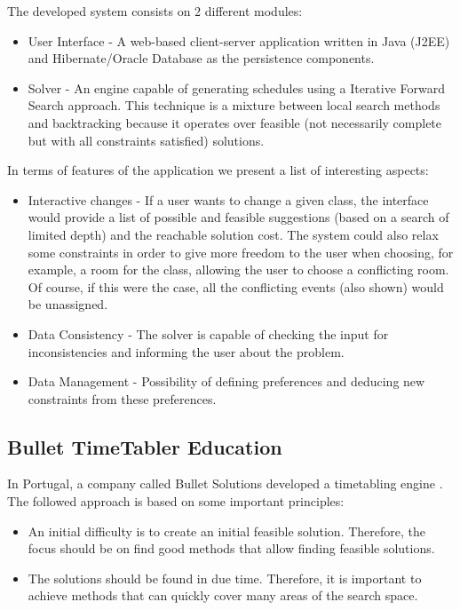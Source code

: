 The developed system consists on 2 different modules:
\begin{itemize}
	\item User Interface - A web-based client-server application written in Java (J2EE) and Hibernate/Oracle Database as the persistence components.
	\item Solver - An engine capable of generating schedules using a Iterative Forward Search approach. This technique is a mixture between local search methods and backtracking because it operates over feasible (not necessarily complete but with all constraints satisfied) solutions.
\end{itemize} 

In terms of features of the application we present a list of interesting aspects:
\begin{itemize}
	\item Interactive changes - If a user wants to change a given class, the interface would provide a list of possible and feasible suggestions (based on a search of limited depth) and the reachable solution cost. The system could also relax some constraints in order to give more freedom to the user when choosing, for example, a room for the class, allowing the user to choose a conflicting room. Of course, if this were the case, all the conflicting events (also shown) would be unassigned. 
	\item Data Consistency - The solver is capable of checking the input for inconsistencies and informing the user about the problem.
	\item Data Management - Possibility of defining preferences and deducing new constraints from these preferences. 
\end{itemize}


\subsection{Bullet TimeTabler Education}
\label{bullet_algorithm}

In Portugal, a company called Bullet Solutions developed a timetabling engine \citep{bullet_paper}.
The followed approach is based on some important principles:
\begin{itemize}
	\item An initial difficulty is to create an initial feasible solution. Therefore, the focus should be on find good methods that allow finding feasible solutions.
	\item The solutions should be found in due time. Therefore, it is important to achieve methods that can quickly cover many areas of the search space. 
\end{itemize}

